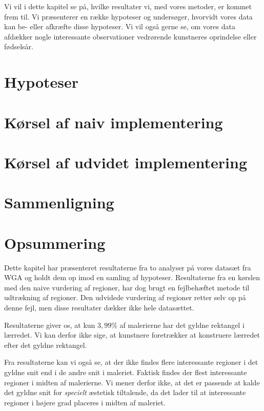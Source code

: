 {
{\sffamily Vi vil i dette kapitel se på, hvilke resultater vi, med vores
metoder, er kommet frem til. Vi præsenterer en række hypoteser og
undersøger, hvorvidt vores data kan be- eller afkræfte disse hypoteser.
Vi vil også gerne se, om vores data afdækker nogle interessante
observationer vedrørende kunstneres oprindelse eller fødselsår.
}

\section{Hypoteser}


\section{Kørsel af naiv implementering\label{section_naiv_koersel}}

\clearpage

\section{Kørsel af udvidet implementering\label{section_udvidet_koersel}}


\section{Sammenligning\label{section_samlede_resultater}}


\section*{Opsummering}
Dette kapitel har præsenteret resultaterne fra to analyser på vores
datasæt fra WGA og holdt dem op imod en samling af hypoteser.
Resultaterne fra en kørslen med den naive vurdering af regioner, har dog
brugt en fejlbehæftet metode til udtrækning af regioner.  Den udvidede
vurdering af regioner retter selv op på denne fejl, men disse resultater
dækker ikke hele datasættet.

Resultaterne giver os, at kun $3,99 \%$ af malerierne har det
gyldne rektangel i lærredet. Vi kan derfor ikke sige, at kunstnere
foretrækker at konstruere lærredet efter det gyldne rektangel.

Fra resultaterne kan vi også se, at der ikke findes flere interessante
regioner i det gyldne snit end i de andre snit i maleriet. Faktisk
findes der flest interessante regioner i midten af malerierne. Vi mener
derfor ikke, at det er passende at kalde det gyldne snit for
\emph{specielt} æstetisk tiltalende, da det lader til at interessante
regioner i højere grad placeres i midten af maleriet.

}
